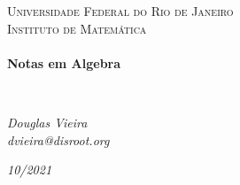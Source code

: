 \begin{titlepage}
\begin{center}
\textsc{\Large Universidade Federal do Rio de Janeiro}\\
\textsc{\large Instituto de Matemática}\\[1.5cm]
\LinhaR \\[0.4cm]
{ \LARGE \bfseries Notas em Algebra \\[0.4cm]}

\LinhaR \\[1.4cm]

\noindent
\begin{minipage}{0.4\textwidth}
\begin{center} \large
\emph{Douglas Vieira}\\
\itshape{dvieira@disroot.org}
\end{center}
\end{minipage}

\begin{center}
\end{center}

\vfill
{\large \textit{10/2021}}

\end{center}
\end{titlepage}
\clearpage